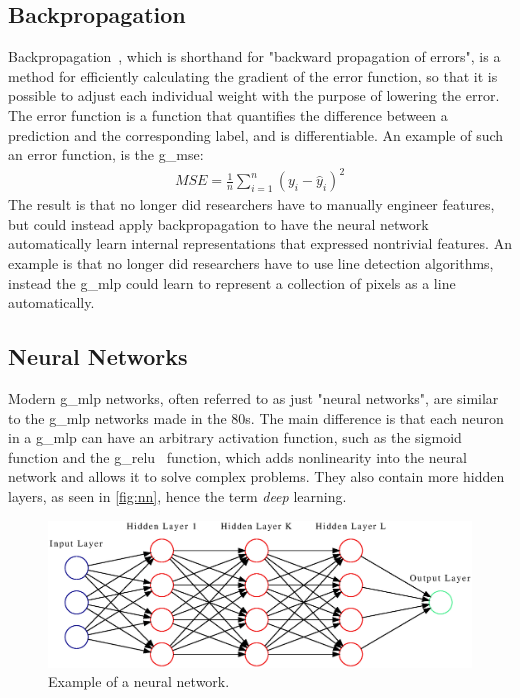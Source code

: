 \subsection{Backpropagation}
Backpropagation~\cite{backprop}, which is shorthand for "backward propagation of errors",  is a method for efficiently calculating the gradient of the error function, so that it is possible to adjust each individual weight with the purpose of lowering the error. The error function is a function that quantifies the difference between a prediction and the corresponding label, and is differentiable. An example of such an error function, is the \gls*{g_mse}:
\begin{align*}
    MSE=\frac{1}{n}\sum_{i=1}^n (y_i-\hat{y}_i)^2
\end{align*}
The result is that no longer did researchers have to manually engineer features, but could instead apply backpropagation to have the neural network automatically learn internal representations that expressed nontrivial features. An example is that no longer did researchers have to use line detection algorithms, instead the \gls*{g_mlp} could learn to represent a collection of pixels as a line automatically.
\subsection{Neural Networks}
Modern \gls*{g_mlp} networks, often referred to as just "neural networks", are similar to the \gls*{g_mlp} networks made in the 80s. The main difference is that each neuron in a \gls*{g_mlp} can have an arbitrary activation function, such as the sigmoid function and the \gls*{g_relu}~\cite{relu} function, which adds nonlinearity into the neural network and allows it to solve complex problems. They also contain more hidden layers, as seen in \autoref{fig:nn}, hence the term \emph{deep} learning.
\begin{figure}[H]
    \centering
    \includegraphics[width=\linewidth]{resources/related_works/nn.gv.eps}
    \caption[Neural Network Example]{Example of a neural network.}
    \label{fig:nn}
\end{figure}
